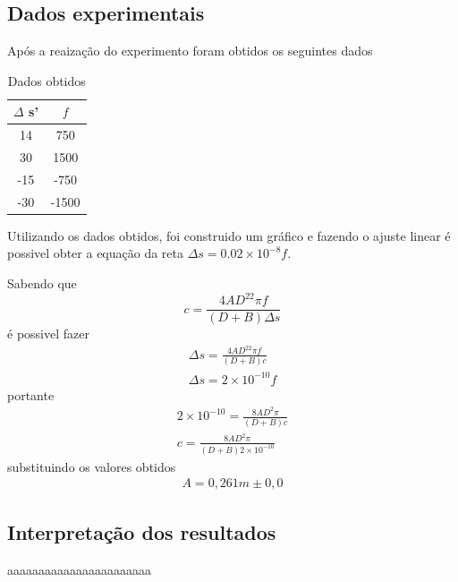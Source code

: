 \subsection{Dados experimentais}
Após a reaização do experimento foram obtidos os seguintes dados
\begin{table}[h!]
\centering

\begin{tabular}{|	c	|	c	|}
\hline
$\Delta$ s' & $f$   \\ \hline
14          & 750   \\ \hline
30          & 1500  \\ \hline
-15         & -750  \\ \hline
-30         & -1500 \\ \hline
\end{tabular}
\caption{Dados obtidos}
\end{table}
Utilizando os dados obtidos, foi construido um gráfico e fazendo o
ajuste linear é possivel obter a equação da reta $\Delta s
=0.02\times10^{-8}f$.

Sabendo que
\begin{equation}
	c = \frac{4AD^22\pi f}{(D+B)\Delta s}
\end{equation}
é possivel fazer
\begin{equation}
\begin{split}
	\Delta s = \frac{4AD^22\pi f}{(D+B)c}\\
	\Delta s = 2\times10^{-10}f
\end{split}
\end{equation}
portante
\begin{equation}
\begin{split}
	2\times10^{-10}=\frac{8AD^2\pi}{(D+B)c}\\
	c=\frac{8AD^2\pi}{(D+B)2\times10^{-10}}
\end{split}
\end{equation}
substituindo os valores obtidos
\begin{equation}
	\begin{split}
		A = 0,261 m \pm 0,0
	\end{split}
\end{equation}
\subsection{Interpretação dos resultados}

aaaaaaaaaaaaaaaaaaaaaaa
